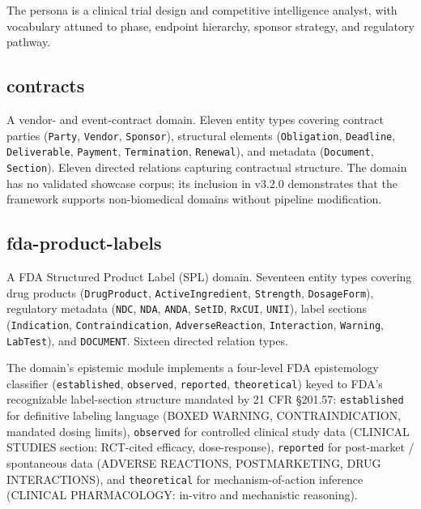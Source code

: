 The persona is a clinical trial design and competitive intelligence analyst, with vocabulary attuned to phase, endpoint hierarchy, sponsor strategy, and regulatory pathway.

\subsection{contracts}

A vendor- and event-contract domain. Eleven entity types covering contract parties (\texttt{Party}, \texttt{Vendor}, \texttt{Sponsor}), structural elements (\texttt{Obligation}, \texttt{Deadline}, \texttt{Deliverable}, \texttt{Payment}, \texttt{Termination}, \texttt{Renewal}), and metadata (\texttt{Document}, \texttt{Section}). Eleven directed relations capturing contractual structure. The domain has no validated showcase corpus; its inclusion in v3.2.0 demonstrates that the framework supports non-biomedical domains without pipeline modification.

\subsection{fda-product-labels}

A FDA Structured Product Label (SPL) domain. Seventeen entity types covering drug products (\texttt{DrugProduct}, \texttt{ActiveIngredient}, \texttt{Strength}, \texttt{DosageForm}), regulatory metadata (\texttt{NDC}, \texttt{NDA}, \texttt{ANDA}, \texttt{SetID}, \texttt{RxCUI}, \texttt{UNII}), label sections (\texttt{Indication}, \texttt{Contraindication}, \texttt{AdverseReaction}, \texttt{Interaction}, \texttt{Warning}, \texttt{LabTest}), and \texttt{DOCUMENT}. Sixteen directed relation types.

The domain's epistemic module implements a four-level FDA epistemology classifier (\texttt{established}, \texttt{observed}, \texttt{reported}, \texttt{theoretical}) keyed to FDA's recognizable label-section structure mandated by 21 CFR §201.57: \texttt{established} for definitive labeling language (BOXED WARNING, CONTRAINDICATION, mandated dosing limits), \texttt{observed} for controlled clinical study data (CLINICAL STUDIES section: RCT-cited efficacy, dose-response), \texttt{reported} for post-market / spontaneous data (ADVERSE REACTIONS, POSTMARKETING, DRUG INTERACTIONS), and \texttt{theoretical} for mechanism-of-action inference (CLINICAL PHARMACOLOGY: in-vitro and mechanistic reasoning).

